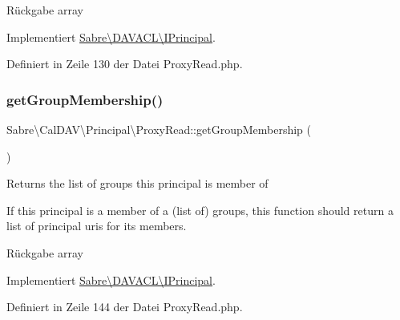 \begin{DoxyReturn}{Rückgabe}
array 
\end{DoxyReturn}


Implementiert \mbox{\hyperlink{interface_sabre_1_1_d_a_v_a_c_l_1_1_i_principal_ad9f9e4ed25ec5ec9325288b076cdd09f}{Sabre\textbackslash{}\+D\+A\+V\+A\+C\+L\textbackslash{}\+I\+Principal}}.



Definiert in Zeile 130 der Datei Proxy\+Read.\+php.

\mbox{\label{class_sabre_1_1_cal_d_a_v_1_1_principal_1_1_proxy_read_a90cc837d2d8cdf82b369f25dc22e64c3}} 
\subsubsection{\texorpdfstring{get\+Group\+Membership()}{getGroupMembership()}}
{\footnotesize\ttfamily Sabre\textbackslash{}\+Cal\+D\+A\+V\textbackslash{}\+Principal\textbackslash{}\+Proxy\+Read\+::get\+Group\+Membership (\begin{DoxyParamCaption}{ }\end{DoxyParamCaption})}

Returns the list of groups this principal is member of

If this principal is a member of a (list of) groups, this function should return a list of principal uri\textquotesingle{}s for it\textquotesingle{}s members.

\begin{DoxyReturn}{Rückgabe}
array 
\end{DoxyReturn}


Implementiert \mbox{\hyperlink{interface_sabre_1_1_d_a_v_a_c_l_1_1_i_principal_a8921b6c6ba5421dd0a6f6ba26def6fbd}{Sabre\textbackslash{}\+D\+A\+V\+A\+C\+L\textbackslash{}\+I\+Principal}}.



Definiert in Zeile 144 der Datei Proxy\+Read.\+php.

\mbox{\label{class_sabre_1_1_cal_d_a_v_1_1_principal_1_1_proxy_read_a62ef8f211758d660cf090b6e8f4d88f5}} 
